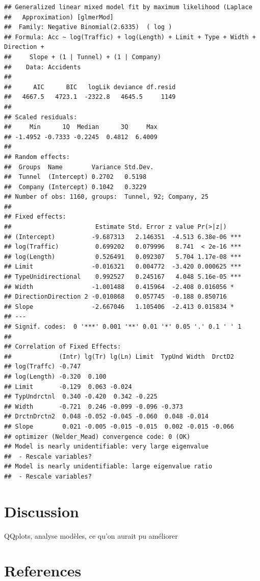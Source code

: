\documentclass[
]{article}
\begin{document}
\begin{verbatim}
## Generalized linear mixed model fit by maximum likelihood (Laplace
##   Approximation) [glmerMod]
##  Family: Negative Binomial(2.6335)  ( log )
## Formula: Acc ~ log(Traffic) + log(Length) + Limit + Type + Width + Direction +  
##     Slope + (1 | Tunnel) + (1 | Company)
##    Data: Accidents
## 
##      AIC      BIC   logLik deviance df.resid 
##   4667.5   4723.1  -2322.8   4645.5     1149 
## 
## Scaled residuals: 
##     Min      1Q  Median      3Q     Max 
## -1.4952 -0.7333 -0.2245  0.4812  6.4009 
## 
## Random effects:
##  Groups  Name        Variance Std.Dev.
##  Tunnel  (Intercept) 0.2702   0.5198  
##  Company (Intercept) 0.1042   0.3229  
## Number of obs: 1160, groups:  Tunnel, 92; Company, 25
## 
## Fixed effects:
##                       Estimate Std. Error z value Pr(>|z|)    
## (Intercept)          -9.687313   2.146351  -4.513 6.38e-06 ***
## log(Traffic)          0.699202   0.079996   8.741  < 2e-16 ***
## log(Length)           0.526491   0.092307   5.704 1.17e-08 ***
## Limit                -0.016321   0.004772  -3.420 0.000625 ***
## TypeUnidirectional    0.992527   0.245167   4.048 5.16e-05 ***
## Width                -1.001488   0.415964  -2.408 0.016056 *  
## DirectionDirection 2 -0.010868   0.057745  -0.188 0.850716    
## Slope                -2.667046   1.105406  -2.413 0.015834 *  
## ---
## Signif. codes:  0 '***' 0.001 '**' 0.01 '*' 0.05 '.' 0.1 ' ' 1
## 
## Correlation of Fixed Effects:
##             (Intr) lg(Tr) lg(Ln) Limit  TypUnd Width  DrctD2
## log(Traffc) -0.747                                          
## log(Length) -0.320  0.100                                   
## Limit       -0.129  0.063 -0.024                            
## TypUndrctnl  0.340 -0.420  0.342 -0.225                     
## Width       -0.721  0.246 -0.099 -0.096 -0.373              
## DrctnDrctn2  0.048 -0.052 -0.045 -0.060  0.048 -0.014       
## Slope        0.021 -0.005 -0.015 -0.015  0.002 -0.015 -0.066
## optimizer (Nelder_Mead) convergence code: 0 (OK)
## Model is nearly unidentifiable: very large eigenvalue
##  - Rescale variables?
## Model is nearly unidentifiable: large eigenvalue ratio
##  - Rescale variables?
\end{verbatim}

\hypertarget{discussion}{%
\section{Discussion}\label{discussion}}

QQplots, analyse modèles, ce qu'on aurait pu améliorer

\hypertarget{references}{%
\section{References}\label{references}}
\end{document}
